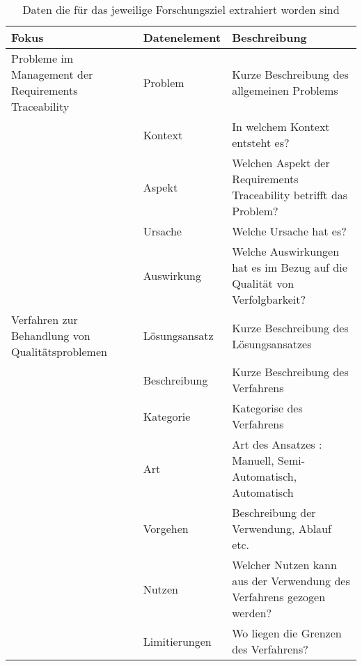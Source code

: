 \begin{table*}[!ht]
    \centering
    \begin{tabularx}{\textwidth}{ssX}
        \toprule
        Fokus & Datenelement & Beschreibung \\ \midrule
       Probleme im Management der Requirements Traceability & Problem & Kurze Beschreibung des allgemeinen Problems \\
        & Kontext & In welchem Kontext entsteht es? \\
        & Aspekt & Welchen Aspekt der Requirements Traceability betrifft das Problem? \\
        & Ursache & Welche Ursache hat es?  \\
        & Auswirkung  & Welche Auswirkungen hat es im Bezug auf die Qualität von Verfolgbarkeit? \\
        Verfahren zur Behandlung von Qualitätsproblemen & Lösungsansatz & Kurze Beschreibung des Lösungsansatzes \\
        & Beschreibung  & Kurze Beschreibung des Verfahrens  \\
        & Kategorie & Kategorise des Verfahrens \\
        & Art & Art des Ansatzes : Manuell, Semi-Automatisch, Automatisch \\
        & Vorgehen & Beschreibung der Verwendung, Ablauf etc. \\
        & Nutzen & Welcher Nutzen kann aus der Verwendung des Verfahrens gezogen werden? \\
        & Limitierungen & Wo liegen die Grenzen des Verfahrens? \\
    \bottomrule
    \end{tabularx}
    \caption{Daten die für das jeweilige Forschungsziel extrahiert worden sind}
    \label{tab:dataextraction_special}
\end{table*}


